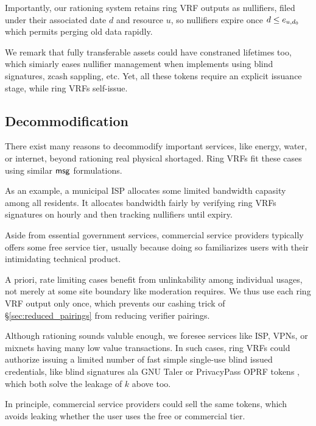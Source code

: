 Importantly, our rationing system retains ring VRF outputs as nullifiers,
filed under their associated date $d$ and resource $u$, so nullifiers
expire once $d \le e_{u,d_0}$ which permits perging old data rapidly.

We remark that fully transferable assets could have constraned lifetimes
too, which simiarly eases nullifier management when implements using
blind signatures, zcash sappling, etc.  Yet, all these tokens require
an explicit issuance stage, while ring VRFs self-issue.


\subsection{Decommodification}

There exist many reasons to decommodify important services,
like energy, water, or internet,
 beyond rationing real physical shortaged.
Ring VRFs fit these cases using similar $\mathsf{msg}$ formulations.

As an example, a municipal ISP allocates some limited bandwidth capasity
among all residents.  It allocates bandwidth fairly by verifying ring VRFs
signatures on hourly \msg and then tracking nullifiers until expiry.

Aside from essential government services, commercial service providers
typically offers some free service tier, usually because doing so
familiarizes users with their intimidating technical product.


A priori, rate limiting cases benefit from unlinkability among individual
usages, not merely at some site boundary like moderation requires.
We thus use each ring VRF output only once, which prevents our cashing
trick of \S\ref{sec:reduced_pairings} from reducing verifier pairings.

Although rationing sounds valuble enough, we foresee services like ISP,
VPNs, or mixnets having many low value transactions.
In such cases, ring VRFs could authorize issuing a limited number of
fast simple single-use blind issued credentials, like blind signatures
ala GNU Taler \cite{taler} or PrivacyPass OPRF tokens \cite{PrivacyPass},
 which both solve the leakage of $k$ above too.

In principle, commercial service providers could sell the same tokens,
which avoids leaking whether the user uses the free or commercial tier.


